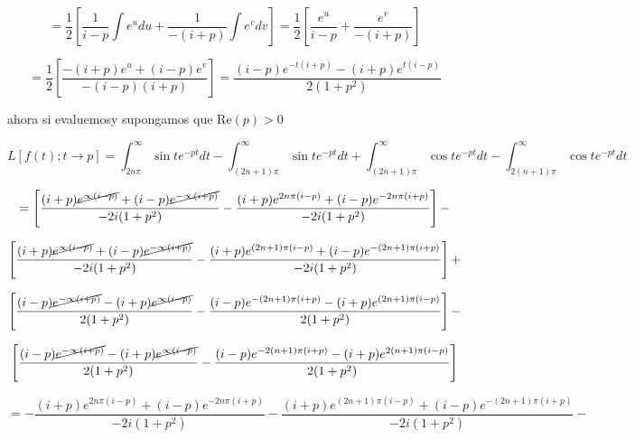\documentclass[12pt,a4paper]{article}
\begin{document}
\begin{enumerate}
    \begin{equation*}
        =\frac{1}{2}\left[\frac{1}{i-p} \int  e^{u}du+ \frac{1}{-(i+p)} \int e^{v}dv\right]=\frac{1}{2}\left[\frac{e^{u}}{i-p}+ \frac{e^{v}}{-(i+p)}\right]
    \end{equation*}
    
    \begin{equation*}
        =\frac{1}{2}\left[\frac{-(i+p)e^{u}+(i-p)e^{v}}{-(i-p)(i+p)}\right]=\frac{(i-p)e^{-t(i+p)}-(i+p)e^{t(i-p)}}{2(1+p^2)}
    \end{equation*}
    
    ahora si evaluemosy supongamos que Re$(p)>0$
    
    \begin{equation*}
         L[f(t);t \rightarrow p]=\int_{2n\pi}^{\infty}\sin{t}e^{-pt} dt-\int_{(2n+1)\pi}^{\infty}\sin{t} e^{-pt} dt + \int_{(2n+1)\pi}^{\infty}\cos{t}e^{-pt} dt-\int_{2(n+1)\pi}^{\infty}\cos{t}e^{-pt} dt
    \end{equation*}
    
    
    \begin{equation*}
        =\left[\frac{(i+p)\cancel{e^{\infty(i-p)}}+(i-p)\cancel{e^{-\infty(i+p)}}}{-2i(1+p^2)}-\frac{(i+p)e^{2n\pi(i-p)}+(i-p)e^{-2n\pi(i+p)}}{-2i(1+p^2)}\right]-
    \end{equation*}
    
    \begin{equation*}
        \left[\frac{(i+p)\cancel{e^{\infty(i-p)}}+(i-p)\cancel{e^{-\infty(i+p)}}}{-2i(1+p^2)}-\frac{(i+p)e^{(2n+1)\pi(i-p)}+(i-p)e^{-(2n+1)\pi(i+p)}}{-2i(1+p^2)}\right]+
    \end{equation*}
    
    \begin{equation*}
        \left[\frac{(i-p)\cancel{e^{-\infty(i+p)}}-(i+p)\cancel{e^{\infty(i-p)}}}{2(1+p^2)}-\frac{(i-p)e^{-(2n+1)\pi(i+p)}-(i+p)e^{(2n+1)\pi(i-p)}}{2(1+p^2)}\right]-
    \end{equation*}
    
    \begin{equation*}
        \left[\frac{(i-p)\cancel{e^{-\infty(i+p)}}-(i+p)\cancel{e^{\infty(i-p)}}}{2(1+p^2)}-\frac{(i-p)e^{-2(n+1)\pi(i+p)}-(i+p)e^{2(n+1)\pi(i-p)}}{2(1+p^2)}\right]
    \end{equation*}
    
    \begin{equation*}
        =-\frac{(i+p)e^{2n\pi(i-p)}+(i-p)e^{-2n\pi(i+p)}}{-2i(1+p^2)}-\frac{(i+p)e^{(2n+1)\pi(i-p)}+(i-p)e^{-(2n+1)\pi(i+p)}}{-2i(1+p^2)}-
    \end{equation*}
    

\end{enumerate}
\end{document}
